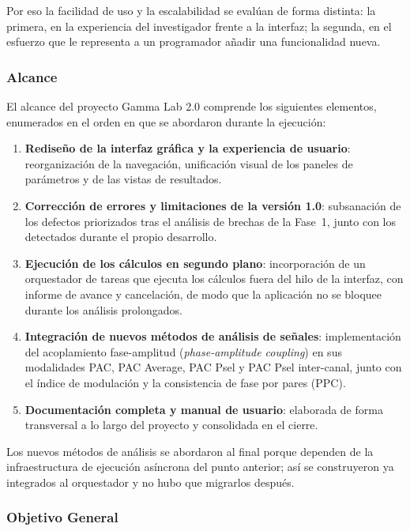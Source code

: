 \documentclass{article}
\begin{document}
Por eso la facilidad de uso y la escalabilidad se evalúan de forma distinta: la primera, en la experiencia del investigador frente a la interfaz; la segunda, en el esfuerzo que le representa a un programador añadir una funcionalidad nueva.
 
\subsubsection{Alcance}
 
El alcance del proyecto Gamma Lab 2.0 comprende los siguientes elementos, enumerados en el orden en que se abordaron durante la ejecución:
 
\begin{enumerate}
    \item \textbf{Rediseño de la interfaz gráfica y la experiencia de usuario}: reorganización de la navegación, unificación visual de los paneles de parámetros y de las vistas de resultados.

    \item \textbf{Corrección de errores y limitaciones de la versión 1.0}: subsanación de los defectos priorizados tras el análisis de brechas de la Fase~1, junto con los detectados durante el propio desarrollo.

    \item \textbf{Ejecución de los cálculos en segundo plano}: incorporación de un orquestador de tareas que ejecuta los cálculos fuera del hilo de la interfaz, con informe de avance y cancelación, de modo que la aplicación no se bloquee durante los análisis prolongados.

    \item \textbf{Integración de nuevos métodos de análisis de señales}: implementación del acoplamiento fase-amplitud (\textit{phase-amplitude coupling}) en sus modalidades PAC, PAC Average, PAC Psel y PAC Psel inter-canal, junto con el índice de modulación y la consistencia de fase por pares (PPC).

    \item \textbf{Documentación completa y manual de usuario}: elaborada de forma transversal a lo largo del proyecto y consolidada en el cierre.
\end{enumerate}
 
Los nuevos métodos de análisis se abordaron al final porque dependen de la infraestructura de ejecución asíncrona del punto anterior; así se construyeron ya integrados al orquestador y no hubo que migrarlos después.
 
\subsubsection{Objetivo General}
 
\end{document}
